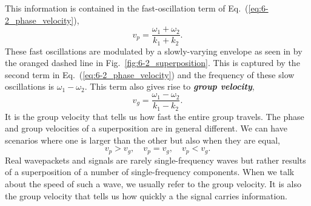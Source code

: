 This information is contained in the fast-oscillation term of Eq.~(\ref{eq:6-2_phase_velocity}),
\begin{equation}
    v_p = \frac{\omega_1 + \omega_2}{k_1 + k_2}.
\end{equation}
These fast oscillations are modulated by a slowly-varying envelope as seen in by the oranged dashed line in Fig.~\ref{fig:6-2_superposition}.
This is captured by the second term in Eq.~(\ref{eq:6-2_phase_velocity}) and the frequency of these slow oscillations is $\omega_1-\omega_2$.
This term also gives rise to \textit{\textbf{group velocity}},
\begin{equation}
    v_g = \frac{\omega_1 - \omega_2}{k_1 - k_2}.
\end{equation}
It is the group velocity that tells us how fast the entire group travels.
The phase and group velocities of a superposition are in general different.
We can have scenarios where one is larger than the other but also when they are equal,
\begin{equation}
    v_p > v_g, \quad v_p = v_g, \quad v_p < v_g.
\end{equation}
Real wavepackets and signals are rarely single-frequency waves but rather results of a superposition of a number of single-frequency components.
When we talk about the speed of such a wave, we usually refer to the group velocity.
It is also the group velocity that tells us how quickly a the signal carries information.


